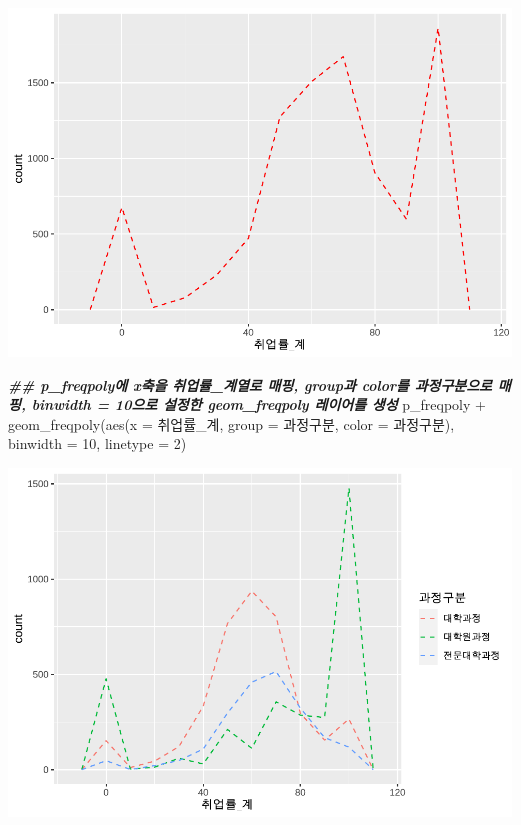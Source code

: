 \documentclass[
]{article}
\newenvironment{Shaded}{\begin{snugshade}}{\end{snugshade}}
\newcommand{\AttributeTok}[1]{\textcolor[rgb]{0.77,0.63,0.00}{#1}}
\newcommand{\DecValTok}[1]{\textcolor[rgb]{0.00,0.00,0.81}{#1}}
\newcommand{\DocumentationTok}[1]{\textcolor[rgb]{0.56,0.35,0.01}{\textbf{\textit{#1}}}}
\newcommand{\FunctionTok}[1]{\textcolor[rgb]{0.00,0.00,0.00}{#1}}
\newcommand{\NormalTok}[1]{#1}
\newcommand{\SpecialCharTok}[1]{\textcolor[rgb]{0.00,0.00,0.00}{#1}}
\begin{document}
\includegraphics{chap3_files/figure-latex/unnamed-chunk-22-4.pdf}

\begin{Shaded}
\begin{Highlighting}[]
\DocumentationTok{\#\# p\_freqpoly에 x축을 \textquotesingle{}취업률\_계\textquotesingle{}열로 매핑, group과 color를 과정구분으로 매핑, binwidth = 10으로 설정한 geom\_freqpoly 레이어를 생성 }
\NormalTok{p\_freqpoly }\SpecialCharTok{+}
  \FunctionTok{geom\_freqpoly}\NormalTok{(}\FunctionTok{aes}\NormalTok{(}\AttributeTok{x =}\NormalTok{ 취업률\_계, }\AttributeTok{group =}\NormalTok{ 과정구분, }\AttributeTok{color =}\NormalTok{ 과정구분), }\AttributeTok{binwidth =} \DecValTok{10}\NormalTok{, }\AttributeTok{linetype =} \DecValTok{2}\NormalTok{)}
\end{Highlighting}
\end{Shaded}

\includegraphics{chap3_files/figure-latex/unnamed-chunk-22-5.pdf}
\end{document}
